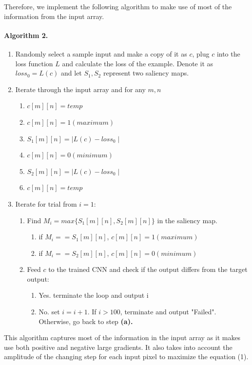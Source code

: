 \documentclass{article}
\begin{document}
Therefore, we implement the following algorithm to make use of most of the information from the input array.

\paragraph{Algorithm 2.}
\begin{enumerate}
	\item Randomly select a sample input and make a copy of it as $c$, plug $c$ into the loss function $L$ and calculate the loss of the example. Denote it as $loss_0=L(c)$ and let $S_1,S_2$ represent two saliency maps.
	\item Iterate through the input array and for any $m,n$
		\begin{enumerate}
			\item $c[m][n]=temp$
			\item $c[m][n]=1(maximum)$
			\item $S_1[m][n]= \mid L(c) - loss_0 \mid$
			\item $c[m][n]=0(minimum)$
			\item $S_2[m][n]=\mid L(c) - loss_0 \mid$
			\item $c[m][n]=temp$
		\end{enumerate}

	\item Iterate for trial from $i=1$:
		\begin{enumerate}
			\item Find $M_i=max\{S_1[m][n],S_2[m][n]\}$ in the saliency map.
				\begin{enumerate}
					\item if $M_i==S_1[m][n]$, $c[m][n]=1(maximum)$
					\item if $M_i==S_2[m][n]$, $c[m][n]=0(minimum)$
				\end{enumerate}
			\item Feed $c$ to the trained CNN and check if the output differs from the target output:
				\begin{enumerate}
					\item Yes. terminate the loop and output i
					\item No. set $i=i+1$. If $i > 100$, terminate and output "Failed". Otherwise, go back to step \textbf{(a).}
				\end{enumerate}
		\end{enumerate}
\end{enumerate}

This algorithm captures most of the information in the input array as it makes use both positive and negative large gradients. It also takes into account the amplitude of the changing step for each input pixel to maximize the equation (1).
\end{document}
